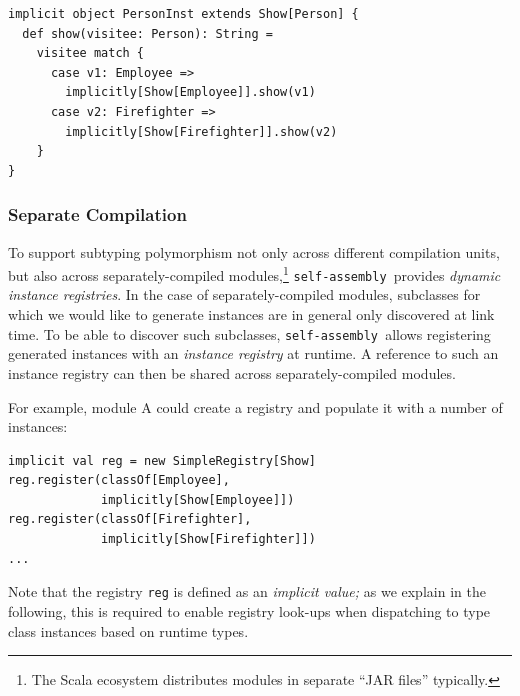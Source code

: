 \documentclass[preprint]{sigplanconf}
\newcommand{\selfassembly}{\texttt{self-assembly~}}
\begin{document}
\begin{lstlisting}
implicit object PersonInst extends Show[Person] {
  def show(visitee: Person): String =
    visitee match {
      case v1: Employee =>
        implicitly[Show[Employee]].show(v1)
      case v2: Firefighter =>
        implicitly[Show[Firefighter]].show(v2)
    }
}
\end{lstlisting}




\subsubsection{Separate Compilation}\label{sec:oo-sub-sep}

To support subtyping polymorphism not only across different compilation units,
but also across separately-compiled modules,\footnote{The Scala ecosystem distributes modules in separate ``JAR files'' typically.}
\selfassembly provides \emph{dynamic instance registries}. In the case of
separately-compiled modules, subclasses for which we would like to generate
instances are in general only discovered at link time. To be able to discover
such subclasses, \selfassembly allows registering generated instances
with an \emph{instance registry} at runtime. A reference to such an
instance registry can then be shared across separately-compiled modules.

For example, module A could create a registry and populate it with a number of
instances:
\begin{lstlisting}
implicit val reg = new SimpleRegistry[Show]
reg.register(classOf[Employee],
             implicitly[Show[Employee]])
reg.register(classOf[Firefighter],
             implicitly[Show[Firefighter]])
...
\end{lstlisting}
\noindent
Note that the registry \verb|reg| is defined as an \emph{implicit value;} as we
explain in the following, this is required to enable registry look-ups when
dispatching to type class instances based on runtime types.
\end{document}
